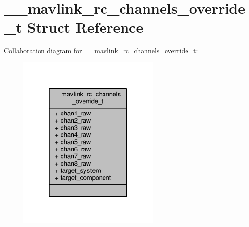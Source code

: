 \hypertarget{struct____mavlink__rc__channels__override__t}{\section{\+\_\+\+\_\+mavlink\+\_\+rc\+\_\+channels\+\_\+override\+\_\+t Struct Reference}
\label{struct____mavlink__rc__channels__override__t}
}


Collaboration diagram for \+\_\+\+\_\+mavlink\+\_\+rc\+\_\+channels\+\_\+override\+\_\+t\+:
\nopagebreak
\begin{figure}[H]
\begin{center}
\leavevmode
\includegraphics[width=199pt]{struct____mavlink__rc__channels__override__t__coll__graph}
\end{center}
\end{figure}
